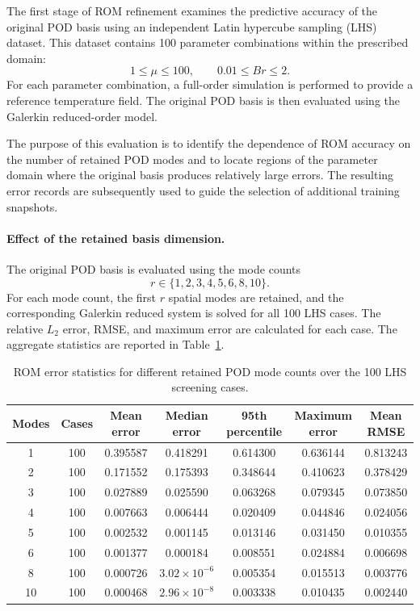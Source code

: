 The first stage of ROM refinement examines the predictive
accuracy of the original POD basis using an independent
Latin hypercube sampling (LHS) dataset. This dataset
contains 100 parameter combinations within the prescribed
domain:
\[
1\leq\mu\leq100,
\qquad
0.01\leq Br\leq2.
\]
For each parameter combination, a full-order simulation
is performed to provide a reference temperature field.
The original POD basis is then evaluated using the
Galerkin reduced-order model.

The purpose of this evaluation is to identify the
dependence of ROM accuracy on the number of retained
POD modes and to locate regions of the parameter domain
where the original basis produces relatively large
errors. The resulting error records are subsequently
used to guide the selection of additional training
snapshots.

\paragraph{Effect of the retained basis dimension.}

The original POD basis is evaluated using the mode
counts
\[
r\in\{1,2,3,4,5,6,8,10\}.
\]
For each mode count, the first $r$ spatial modes are
retained, and the corresponding Galerkin reduced system
is solved for all 100 LHS cases. The relative $L_2$
error, RMSE, and maximum error are calculated for each
case. The aggregate statistics are reported in
Table~\ref{tab:lhs_mode_count_results}.

\begin{table}[htbp]
    \centering
    \caption{ROM error statistics for different retained
    POD mode counts over the 100 LHS screening cases.}
    \label{tab:lhs_mode_count_results}
    \scriptsize
    \setlength{\tabcolsep}{4pt}
    \begin{tabular}{ccccccc}
        \toprule
        \textbf{Modes} &
        \textbf{Cases} &
        \textbf{Mean error} &
        \textbf{Median error} &
        \textbf{95th percentile} &
        \textbf{Maximum error} &
        \textbf{Mean RMSE} \\
        \midrule
        1  & 100 & 0.395587 & 0.418291 & 0.614300 & 0.636144 & 0.813243 \\
        2  & 100 & 0.171552 & 0.175393 & 0.348644 & 0.410623 & 0.378429 \\
        3  & 100 & 0.027889 & 0.025590 & 0.063268 & 0.079345 & 0.073850 \\
        4  & 100 & 0.007663 & 0.006444 & 0.020409 & 0.044846 & 0.024056 \\
        5  & 100 & 0.002532 & 0.001145 & 0.013146 & 0.031450 & 0.010355 \\
        6  & 100 & 0.001377 & 0.000184 & 0.008551 & 0.024884 & 0.006698 \\
        8  & 100 & 0.000726 & $3.02\times10^{-6}$ & 0.005354 & 0.015513 & 0.003776 \\
        10 & 100 & 0.000468 & $2.96\times10^{-8}$ & 0.003338 & 0.010435 & 0.002440 \\
        \bottomrule
    \end{tabular}
\end{table}

